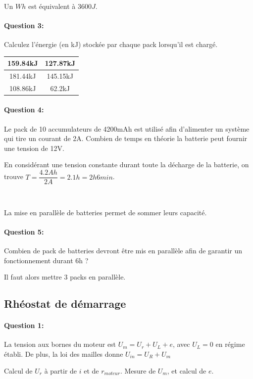 ~\

Un $Wh$ est équivalent à $3600J$.

\paragraph{Question 3:} Calculez l'énergie (en kJ) stockée par chaque pack lorsqu'il est chargé.

\begin{tabular}{|c|c|}
\hline
 159.84kJ & 127.87kJ \\
\hline
181.44kJ & 145.15kJ \\
\hline
108.86kJ & 62.2kJ \\
\hline
\end{tabular}

\paragraph{Question 4:} Le pack de 10 accumulateurs de 4200mAh est utilisé afin d'alimenter un système qui tire un courant de 2A. Combien de temps en théorie la batterie peut fournir une tension de 12V.

En considérant une tension constante durant toute la décharge de la batterie, on trouve $T=\dfrac{4.2Ah}{2A}=2.1h=2h6min$.

~\

La mise en parallèle de batteries permet de sommer leurs capacité. 

\paragraph{Question 5:} Combien de pack de batteries devront être mis en parallèle afin de garantir un fonctionnement durant 6h ?

Il faut alors mettre 3 packs en parallèle.

\subsection{Rhéostat de démarrage}

\paragraph{Question 1:}

La tension aux bornes du moteur est $U_m=U_r+U_L+e$, avec $U_L=0$ en régime établi. De plus, la loi des mailles donne $U_{in}=U_R+U_m$

Calcul de $U_r$ à partir de $i$ et de $r_{moteur}$. Mesure de $U_m$, et calcul de $e$.

